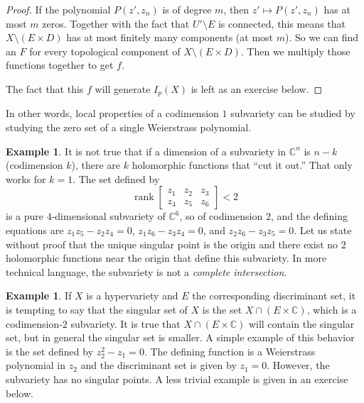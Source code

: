 \documentclass[12pt,openany]{book}
\newcommand{\C}{{\mathbb{C}}}
\newcommand{\rank}{\operatorname{rank}}
\newcommand{\myindex}[1]{#1\index{#1}}
\theoremstyle{plain}
\theoremstyle{remark}
\theoremstyle{definition}
\theoremstyle{exercise}
\theoremstyle{example}
\newtheorem{example}[thm]{Example}
\begin{document}
\begin{proof}
If the polynomial $P(z',z_n)$ is of degree $m$,
then $z' \mapsto P(z',z_n)$ has at most $m$ zeros.  Together with
the fact that $U' \setminus E$ is connected, this means that
$X \setminus (E \times D)$ has at most finitely many components (at
most $m$).
So we can find an $F$ for every topological component of
$X \setminus ( E \times D )$.  Then we multiply those functions together
to get $f$.

The fact that this $f$ will generate $I_p(X)$ is left as an exercise below.
\end{proof}

In other words, local properties of a codimension $1$ subvariety can be
studied by studying the zero set of a single Weierstrass polynomial.

\begin{example}
It is not true that
if a dimension of a subvariety in $\C^n$ is $n-k$ (codimension $k$),
there are $k$
holomorphic functions that ``cut it out.''  That only works for $k=1$.
The set defined by
\begin{equation*}
\rank
\begin{bmatrix}
z_1 & z_2 & z_3 \\
z_4 & z_5 & z_6
\end{bmatrix}
< 2
\end{equation*}
is a pure $4$-dimensional subvariety of $\C^6$, so of codimension $2$,
and the defining equations are
$z_1z_5-z_2z_4 = 0$,
$z_1z_6-z_3z_4 = 0$, and
$z_2z_6-z_3z_5 = 0$.  Let us state without proof that the unique singular point is the origin and there exist
no $2$ holomorphic functions near the origin
that define this subvariety.  In more technical
language, the subvariety is not a \emph{\myindex{complete intersection}}.
\end{example}

\begin{example}
If $X$ is a hypervariety and $E$ the corresponding discriminant set,
it is tempting to say that the singular set of $X$ is the
set $X \cap (E \times \C)$, which is a codimension-$2$ subvariety.  It is true that
$X \cap (E \times \C)$ will contain the singular set, but in general the
singular set is smaller.
A simple example of this behavior is the set defined by
$z_2^2 - z_1 = 0$.  The defining function is a Weierstrass
polynomial in $z_2$ and the discriminant set is given by $z_1 = 0$.
However, the subvariety has no singular points.  A less trivial example
is given in an exercise below.
\end{example}
\end{document}
